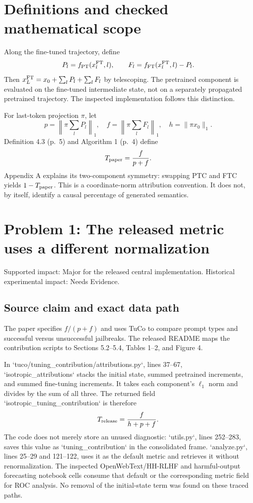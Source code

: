 \documentclass[10pt]{article}
\begin{document}
\section*{Definitions and checked mathematical scope}
Along the fine-tuned trajectory, define \[P_l=f_{\rm PT}(x_l^{\rm FT},l),\qquad
 F_l=f_{\rm FT}(x_l^{\rm FT},l)-P_l.\] Then \(x_L^{\rm FT}=x_0+\sum_lP_l+\sum_lF_l\) by telescoping. The pretrained component is evaluated on the fine-tuned intermediate state, not on a separately propagated pretrained trajectory. The inspected implementation follows this distinction.\par
For last-token projection \(\pi\), let \[p=\left\|\pi\sum_lP_l\right\|_1,\quad
 f=\left\|\pi\sum_lF_l\right\|_1,\quad h=\|\pi x_0\|_1.\] Definition 4.3 (p. 5) and Algorithm 1 (p. 4) define \[T_{\rm paper}=\frac{f}{p+f}.\] Appendix A explains its two-component symmetry: swapping PTC and FTC yields \(1-T_{\rm paper}\). This is a coordinate-norm attribution convention. It does not, by itself, identify a causal percentage of generated semantics.\par
\section*{Problem 1: The released metric uses a different normalization}
Supported impact: Major for the released central implementation. Historical experimental impact: Needs Evidence.\par
\subsection*{Source claim and exact data path}
The paper specifies \(f/(p+f)\) and uses TuCo to compare prompt types and successful versus unsuccessful jailbreaks. The released README maps the contribution scripts to Sections 5.2–5.4, Tables 1–2, and Figure 4.\par
In `tuco/tuning\_contribution/attributions.py`, lines 37–67, `isotropic\_attributions` stacks the initial state, summed pretrained increments, and summed fine-tuning increments. It takes each component’s \(\ell_1\) norm and divides by the sum of all three. The returned field `isotropic\_tuning\_contribution` is therefore \[T_{\rm release}=\frac{f}{h+p+f}.\] The code does not merely store an unused diagnostic: `utils.py`, lines 252–283, saves this value as `tuning\_contribution` in the consolidated frame. `analyze.py`, lines 25–29 and 121–122, uses it as the default metric and retrieves it without renormalization. The inspected OpenWebText/HH-RLHF and harmful-output forecasting notebook cells consume that default or the corresponding metric field for ROC analysis. No removal of the initial-state term was found on these traced paths.\par
\end{document}
